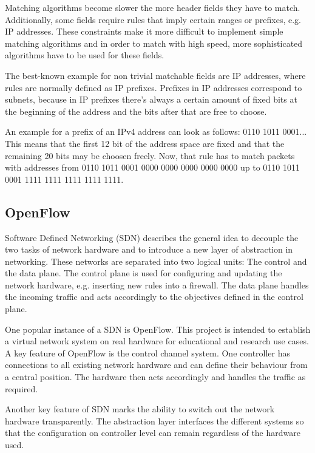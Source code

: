 \documentclass[a4paper,
		12pt,
		parskip=full,
		titlepage
		]{scrartcl}
\begin{document}
Matching algorithms become slower the more header fields they have to match.
Additionally, some fields require rules that imply certain ranges or prefixes, e.g. IP addresses.
These constraints make it more difficult to implement simple matching algorithms and in order to match with high speed, more sophisticated
algorithms have to be used for these fields.

The best-known example for non trivial matchable fields are IP addresses, where rules are normally defined as IP prefixes.
Prefixes in IP addresses correspond to subnets, because in IP prefixes there's always a certain amount of fixed bits at the beginning of the address
and the bits after that are free to choose.

An example for a prefix of an IPv4 address can look as follows:
0110 1011 0001...
This means that the first 12 bit of the address space are fixed and that the remaining 20 bits may be choosen freely.
Now, that rule has to match packets with addresses from 0110 1011 0001 0000 0000 0000 0000 0000 up to
0110 1011 0001 1111 1111 1111 1111 1111. %

\subsection{OpenFlow}
Software Defined Networking (SDN) describes the general idea to decouple the two tasks of network hardware and to introduce a new layer of abstraction in networking. %
These networks are separated into two logical units: The control and the data plane.
The control plane is used for configuring and updating the network hardware, e.g. inserting new rules into a firewall.
The data plane handles the incoming traffic and acts accordingly to the objectives defined in the control plane.

One popular instance of a SDN is OpenFlow.
This project is intended to establish a virtual network system on real hardware for educational and research use cases.
A key feature of OpenFlow is the control channel system.
One controller has connections to all existing network hardware and can define their behaviour from a central position.
The hardware then acts accordingly and handles the traffic as required.

Another key feature of SDN marks the ability to switch out the network hardware transparently.
The abstraction layer interfaces the different systems so that the configuration on controller level can remain regardless of the hardware used.
\end{document}
